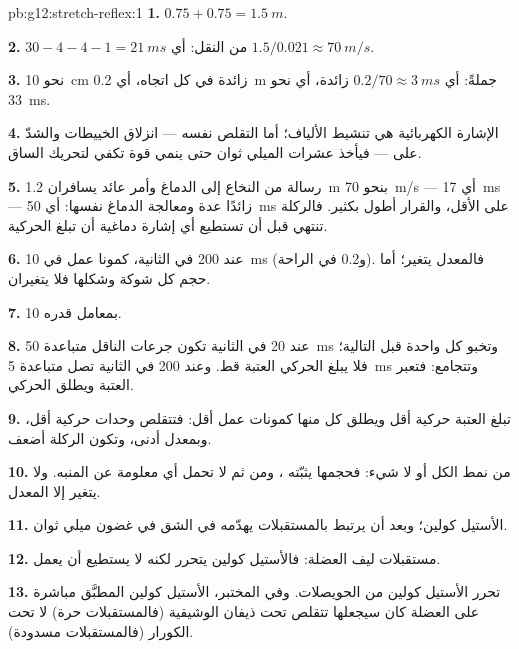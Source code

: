 \begin{solution}{pb:g12:stretch-reflex:1}
\textbf{1.} $0.75 + 0.75 = \qty{1.5}{m}$.

\textbf{2.} $30 - 4 - 4 - 1 = \qty{21}{ms}$ من النقل: أي $1.5/0.021
\approx \qty{70}{m/s}$.

\textbf{3.} نحو \qty{10}{cm} زائدة في كل اتجاه، أي \qty{0.2}{m} جملةً:
أي $0.2/70 \approx \qty{3}{ms}$ زائدة، أي نحو \qty{33}{ms}.

\textbf{4.} الإشارة الكهربائية هي تنشيط الألياف؛ أما التقلص نفسه ---
انزلاق الخييطات والشدّ على  --- فيأخذ عشرات الميلي ثوان حتى ينمي
قوة تكفي لتحريك الساق.

\textbf{5.} رسالة من النخاع إلى الدماغ وأمر عائد يسافران \qty{1.2}{m}
بنحو \qty{70}{m/s} --- أي \qty{17}{ms} --- زائدًا  عدة ومعالجة
الدماغ نفسها: أي \qty{50}{ms} على الأقل، والقرار أطول بكثير. فالركلة
تنتهي قبل أن تستطيع أي إشارة دماغية أن تبلغ  الحركية.

\textbf{6.} عند 200 في الثانية، كمونا عمل في \qty{10}{ms} (و0.2 في
الراحة). فالمعدل يتغير؛ أما حجم كل شوكة وشكلها فلا يتغيران.

\textbf{7.} بمعامل قدره 10.

\textbf{8.} عند 20 في الثانية تكون جرعات الناقل متباعدة \qty{50}{ms}
وتخبو كل واحدة قبل التالية؛ فلا يبلغ  الحركي العتبة قط. وعند
200 في الثانية تصل متباعدة \qty{5}{ms} وتتجامع: فتعبر العتبة ويطلق
 الحركي.

\textbf{9.} تبلغ العتبة  حركية أقل ويطلق كل منها كمونات عمل
أقل: فتتقلص وحدات حركية أقل، وبمعدل أدنى، وتكون الركلة أضعف.

\textbf{10.}  من نمط الكل أو لا شيء: فحجمها يثبّته ،
ومن ثم لا تحمل أي معلومة عن المنبه. ولا يتغير إلا المعدل.

\textbf{11.} الأستيل كولين؛ وبعد أن يرتبط بالمستقبلات يهدّمه  في
الشق في غضون ميلي ثوان.

\textbf{12.} مستقبلات ليف العضلة: فالأستيل كولين يتحرر لكنه لا يستطيع
أن يعمل.

\textbf{13.} تحرر الأستيل كولين من الحويصلات. وفي المختبر، الأستيل
كولين المطبَّق مباشرة على العضلة كان سيجعلها تتقلص تحت ذيفان الوشيقية
(فالمستقبلات حرة) لا تحت الكورار (فالمستقبلات مسدودة).


\end{solution}
